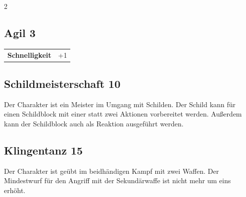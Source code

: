 \begin{multicols}{2}
\begin{tcolorbox}
    \subsection*{Agil \hfill \small{3 }}
    \tcblower




\begin{tabular}{@{}ll@{}}
    \textbf{Schnelligkeit} & +1\\
\end{tabular}


\end{tcolorbox}

\begin{tcolorbox}
    \subsection*{Schildmeisterschaft \hfill \small{10 }}
    \tcblower
Der Charakter ist ein Meister im Umgang mit Schilden. Der Schild kann für einen Schildblock mit einer statt zwei Aktionen vorbereitet werden. Außerdem kann der Schildblock auch als Reaktion ausgeführt werden.


\vspace{3mm}



\end{tcolorbox}

\begin{tcolorbox}
    \subsection*{Klingentanz \hfill \small{15 }}
    \tcblower
Der Charakter ist geübt im beidhändigen Kampf mit zwei Waffen. Der Mindestwurf für den Angriff mit der Sekundärwaffe ist nicht mehr um eins erhöht.


\vspace{3mm}




\end{tcolorbox}
\end{multicols}
